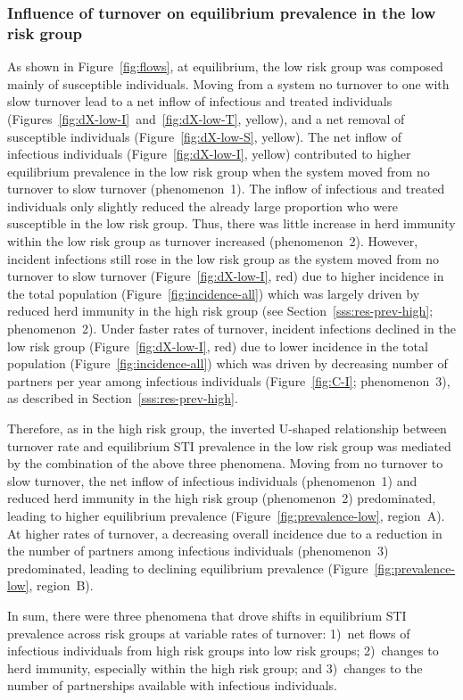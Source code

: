 \subsubsection{Influence of turnover on equilibrium prevalence in the low risk group}
\label{sss:res-prev-low}
As shown in Figure~\ref{fig:flows}, at equilibrium, the low risk group was
composed mainly of susceptible individuals.
Moving from a system no turnover to one with slow turnover
lead to a net inflow of infectious and treated individuals
(Figures~\ref{fig:dX-low-I}~and~\ref{fig:dX-low-T}, yellow),
and a net removal of susceptible individuals
(Figure~\ref{fig:dX-low-S}, yellow).
The net inflow of infectious individuals
(Figure~\ref{fig:dX-low-I}, yellow) contributed to
higher equilibrium prevalence in the low risk group
when the system moved from no turnover to slow turnover
(phenomenon~1).
The inflow of infectious and treated individuals
only slightly reduced the already large proportion who were susceptible
in the low risk group.
Thus, there was little increase in herd immunity within the low risk group
as turnover increased
(phenomenon~2).
However, incident infections still rose in the low risk group
as the system moved from no turnover to slow turnover
(Figure~\ref{fig:dX-low-I}, red)
due to higher incidence in the total population (Figure~\ref{fig:incidence-all})
which was largely driven by
reduced herd immunity in the high risk group
(see Section~\ref{sss:res-prev-high}; phenomenon~2).
Under faster rates of turnover,
incident infections declined in the low risk group
(Figure~\ref{fig:dX-low-I}, red)
due to lower incidence in the total population
(Figure~\ref{fig:incidence-all})
which was driven by
decreasing number of partners per year among infectious individuals
(Figure~\ref{fig:C-I}; phenomenon~3),
as described in Section~\ref{sss:res-prev-high}.
\par
Therefore, as in the high risk group,
the inverted U-shaped relationship between turnover rate
and equilibrium STI prevalence in the low risk group was mediated
by the combination of the above three phenomena.
Moving from no turnover to slow turnover,
the net inflow of infectious individuals (phenomenon~1)
and reduced herd immunity in the high risk group (phenomenon~2)
predominated, leading to higher equilibrium prevalence
(Figure~\ref{fig:prevalence-low}, region~A).
At higher rates of turnover,
a decreasing overall incidence due to
a reduction in the number of partners among infectious individuals (phenomenon~3)
predominated, leading to declining equilibrium prevalence
(Figure~\ref{fig:prevalence-low}, region~B).
\par
In sum, there were three phenomena that
drove shifts in equilibrium STI prevalence across risk groups
at variable rates of turnover:
1)~net flows of infectious individuals from high risk groups into low risk groups;
2)~changes to herd immunity, especially within the high risk group; and
3)~changes to the number of partnerships available with infectious individuals.
